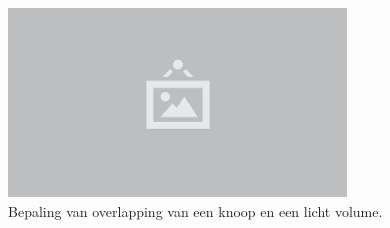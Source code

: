 \begin{figure}
  \centering
  \includegraphics[width=0.8\textwidth]{./img/raw/placeholder.png}
  \caption{Bepaling van overlapping van een knoop en een licht volume.}
  \label{fig:hs-knoop}
\end{figure}
